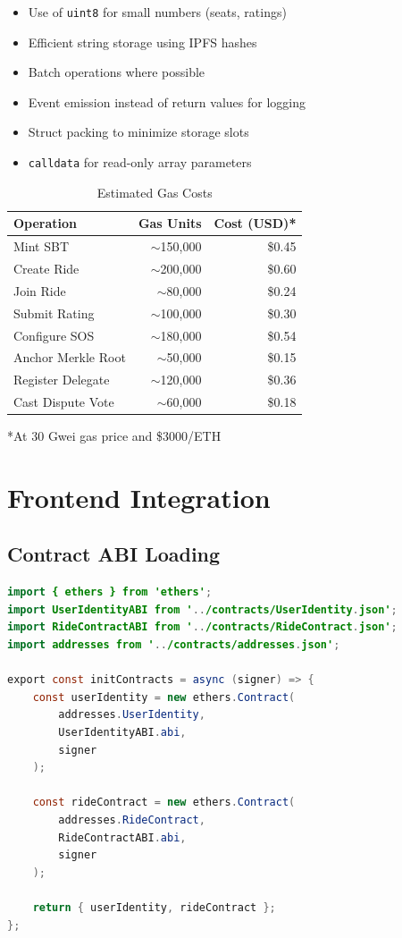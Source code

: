 \begin{itemize}
    \item Use of \texttt{uint8} for small numbers (seats, ratings)
    \item Efficient string storage using IPFS hashes
    \item Batch operations where possible
    \item Event emission instead of return values for logging
    \item Struct packing to minimize storage slots
    \item \texttt{calldata} for read-only array parameters
\end{itemize}

\begin{table}[H]
\centering
\caption{Estimated Gas Costs}
\begin{tabular}{|l|r|r|}
\hline
\textbf{Operation} & \textbf{Gas Units} & \textbf{Cost (USD)*} \\
\hline
Mint SBT & $\sim$150,000 & \$0.45 \\
Create Ride & $\sim$200,000 & \$0.60 \\
Join Ride & $\sim$80,000 & \$0.24 \\
Submit Rating & $\sim$100,000 & \$0.30 \\
Configure SOS & $\sim$180,000 & \$0.54 \\
Anchor Merkle Root & $\sim$50,000 & \$0.15 \\
Register Delegate & $\sim$120,000 & \$0.36 \\
Cast Dispute Vote & $\sim$60,000 & \$0.18 \\
\hline
\end{tabular}
\end{table}
*At 30 Gwei gas price and \$3000/ETH

\section{Frontend Integration}

\subsection{Contract ABI Loading}

\begin{lstlisting}[language=Java, caption=Contract Initialization]
import { ethers } from 'ethers';
import UserIdentityABI from '../contracts/UserIdentity.json';
import RideContractABI from '../contracts/RideContract.json';
import addresses from '../contracts/addresses.json';

export const initContracts = async (signer) => {
    const userIdentity = new ethers.Contract(
        addresses.UserIdentity,
        UserIdentityABI.abi,
        signer
    );
    
    const rideContract = new ethers.Contract(
        addresses.RideContract,
        RideContractABI.abi,
        signer
    );
    
    return { userIdentity, rideContract };
};
\end{lstlisting}

